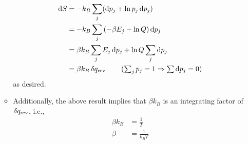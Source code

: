 \documentclass[../notes.tex]{subfiles}
\begin{document}
\begin{itemize}
\begin{itemize}
\begin{align*}
            \dd{S} &= -k_B\sum_j(\dd{p_j}+\ln p_j\dd{p_j})\\
            &= -k_B\sum_j\left( -\beta E_j-\ln Q \right)\dd{p_j}\\
            &= \beta k_B\sum_jE_j\dd{p_j}+\ln Q\sum_j\dd{p_j}\\
            &= \beta k_B\var{q_\text{rev}}\tag{$\sum_jp_j=1\Rightarrow\sum\dd{p_j}=0$}
        \end{align*}
        \endgroup
        as desired.
        \item Additionally, the above result implies that $\beta k_B$ is an integrating factor of $\var{q_\text{rev}}$, i.e.,
        \begin{align*}
            \beta k_B &= \frac{1}{T}\\
            \beta &= \frac{1}{k_BT}
        \end{align*}
    \end{itemize}
\end{itemize}
\end{document}
